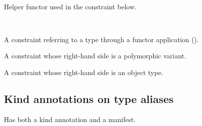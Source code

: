 \\
\label{Oxcaml--module-F_with}\begin{ocamlindent}Helper functor used in the  constraint below.\end{ocamlindent}%
\medbreak
\label{Oxcaml--module-X_with}\\
\label{Oxcaml--type-t_with_functor}\begin{ocamlindent}A  constraint referring to a type through a functor application ().\end{ocamlindent}%
\medbreak
\label{Oxcaml--type-t_with_variant}\begin{ocamlindent}A  constraint whose right-hand side is a polymorphic variant.\end{ocamlindent}%
\medbreak
\label{Oxcaml--type-t_with_object}\begin{ocamlindent}A  constraint whose right-hand side is an object type.\end{ocamlindent}%
\medbreak
\subsection{Kind annotations on type aliases\label{Oxcaml--kind-annotations-on-type-aliases}}%
\label{Oxcaml--type-t_alias}\begin{ocamlindent}Has both a kind annotation and a manifest.\end{ocamlindent}%
\medbreak
